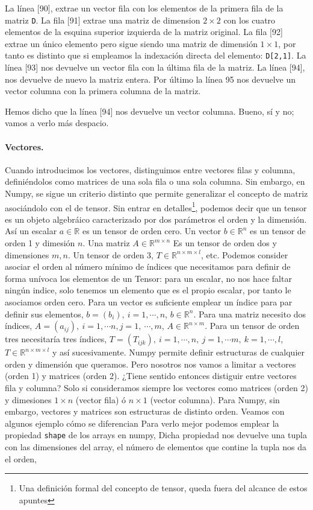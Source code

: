 \begin{paracol}{2}
La línea [90], extrae un vector fila con los elementos de la primera fila de la matriz \texttt{D}. La fila [91] extrae una matriz de dimension $2\times 2$ con los cuatro elementos de la esquina superior izquierda de la matriz original. La fila [92] extrae un único elemento pero sigue siendo una matriz de dimensión $1 \times 1$, por tanto es distinto que si empleamos la indexación directa del elemento: \texttt{D[2,1]}. La línea [93] nos devuelve un vector fila con la última fila de la matriz. La línea [94], nos devuelve de nuevo la matriz entera. Por último la línea 95 nos devuelve un vector columna con la primera columna de la matriz.

Hemos dicho que la línea [94] nos devuelve un vector columna. Bueno, sí y no; vamos a verlo más despacio.

\paragraph{Vectores.}
Cuando introducimos los vectores, distinguimos entre vectores filas y columna, definiéndolos como matrices de una sola fila o una sola columna. Sin embargo, en Numpy, se sigue un criterio distinto que permite generalizar el concepto de matriz asociándolo con el de tensor. Sin entrar en detalles\footnote{Una definición formal del concepto de tensor, queda fuera del alcance de estos apuntes}, podemos decir que un tensor es un objeto algebráico caracterizado por dos parámetros el orden y la dimensión. Así un escalar $a \in \mathbb{R}$ es un tensor de orden cero. Un vector $b \in \mathbb{R}^n$ es un tensor de orden 1 y dimesión $n$. Una matriz $A \in \mathbb{R}^{m\times n}$ Es un tensor de orden dos y dimensiones $m,n$. Un tensor de orden 3, $T \in \mathbb{R}^{n\times m \times l}$, etc. Podemos consider asociar el orden al número mínimo de índices que necesitamos para definir de forma unívoca los elementos de un Tensor: para un escalar, no nos hace faltar ningún indice, solo tenemos un elemento que es el propio escalar, por tanto le asociamos orden cero. Para un vector es suficiente emplear un índice para par definir sus elementos, $b=(b_i),\ i=1,\cdots, n$, $b \in \mathbb{R}^n$. Para una matriz necesito dos índices, $A=(a_{ij}),\ i =1, \cdots n, j = 1,\ \cdots, m$, $A \in \mathbb{R}^{n\times m}$. Para un tensor de orden tres necesitaría tres índices, $T=(T_{ijk}),\ i =1,\cdots, n,\ j =1,\cdots m,\ k = 1,\cdots, l$, $T\in \mathbb{R}^{n\times m \times l}$ y así sucesivamente. Numpy permite definir estructuras de cualquier orden y dimensión que queramos. Pero nosotros nos vamos a limitar a vectores (orden 1) y matrices (orden 2). ¿Tiene sentido entonces distiguir entre vectores fila y columna? Solo si consideramos siempre los vectores como matrices (orden 2) y dimesiones $1\times n$ (vector fila) ó $n \times 1$ (vector columna). Para Numpy, sin embargo, vectores y matrices son estructuras de distinto orden. Veamos con algunos ejemplo cómo se diferencian Para verlo mejor podemos emplear la propiedad \texttt{shape} de los arrays en numpy, Dicha propiedad nos devuelve una tupla con las dimensiones del array, el número de elementos que contine la tupla nos da el orden,
\end{paracol}
